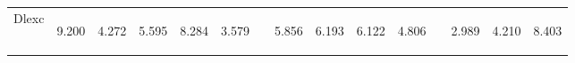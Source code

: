 \begin{center}
\begin{tabular}{lcccccccccccccc}
\noalign{\smallskip}Dlexc & \begin{normalsize}9.200\end{normalsize} & \begin{normalsize}4.272\end{normalsize} & \begin{normalsize}5.595\end{normalsize} & \begin{normalsize}8.284\end{normalsize} & \begin{normalsize}3.579\end{normalsize} & \begin{normalsize}\end{normalsize} & \begin{normalsize}5.856\end{normalsize} & \begin{normalsize}6.193\end{normalsize} & \begin{normalsize}6.122\end{normalsize} & \begin{normalsize}4.806\end{normalsize} & \begin{normalsize}\end{normalsize} & \begin{normalsize}2.989\end{normalsize} & \begin{normalsize}4.210\end{normalsize} & \begin{normalsize}8.403\end{normalsize}\\

\end{tabular}
\end{center}
